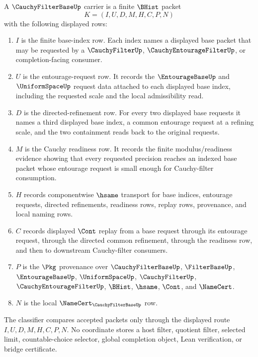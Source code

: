 \begin{definition}
\label{def:cauchy-filter-base-carrier}
A $\CauchyFilterBaseUp$ carrier is a finite $\BHist$ packet
$$
K=(I,U,D,M,H,C,P,N)
$$
with the following displayed rows:
\begin{enumerate}
\item $I$ is the finite base-index row. Each index names a displayed base packet that may be requested by a $\CauchyFilterUp$, $\CauchyEntourageFilterUp$, or completion-facing consumer.
\item $U$ is the entourage-request row. It records the $\EntourageBaseUp$ and $\UniformSpaceUp$ request data attached to each displayed base index, including the requested scale and the local admissibility read.
\item $D$ is the directed-refinement row. For every two displayed base requests it names a third displayed base index, a common entourage request at a refining scale, and the two containment reads back to the original requests.
\item $M$ is the Cauchy readiness row. It records the finite modulus/readiness evidence showing that every requested precision reaches an indexed base packet whose entourage request is small enough for Cauchy-filter consumption.
\item $H$ records componentwise $\hsame$ transport for base indices, entourage requests, directed refinements, readiness rows, replay rows, provenance, and local naming rows.
\item $C$ records displayed $\Cont$ replay from a base request through its entourage request, through the directed common refinement, through the readiness row, and then to downstream Cauchy-filter consumers.
\item $P$ is the $\Pkg$ provenance over $\CauchyFilterBaseUp$, $\FilterBaseUp$, $\EntourageBaseUp$, $\UniformSpaceUp$, $\CauchyFilterUp$, $\CauchyEntourageFilterUp$, $\BHist$, $\hsame$, $\Cont$, and $\NameCert$.
\item $N$ is the local $\NameCert_{\CauchyFilterBaseUp}$ row.
\end{enumerate}
The classifier compares accepted packets only through the displayed route $I,U,D,M,H,C,P,N$. No coordinate stores a host filter, quotient filter, selected limit, countable-choice selector, global completion object, Lean verification, or bridge certificate.
\end{definition}

